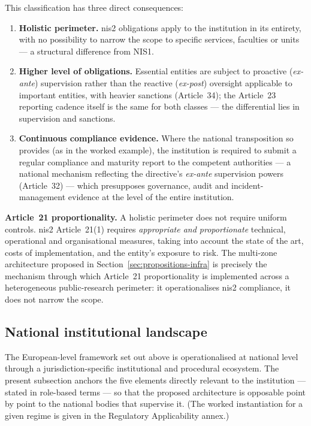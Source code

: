 This classification has three direct consequences:

\begin{enumerate}
    \item \textbf{Holistic perimeter.} \gls{nis2} obligations apply to
    the institution in its entirety, with no possibility to narrow the
    scope to specific services, faculties or units --- a structural
    difference from NIS1.
    \item \textbf{Higher level of obligations.} Essential entities are
    subject to proactive (\emph{ex-ante}) supervision rather than the
    reactive (\emph{ex-post}) oversight applicable to important
    entities, with heavier sanctions (Article~34); the Article~23
    reporting cadence itself is the same for both classes --- the
    differential lies in supervision and sanctions.
    \item \textbf{Continuous compliance evidence.} Where the national
    transposition so provides (as in the worked example), the
    institution is required to submit a regular compliance and
    maturity report to the competent authorities --- a national
    mechanism reflecting the directive's \emph{ex-ante} supervision
    powers (Article~32) --- which presupposes governance, audit and
    incident-management evidence at the level of the entire
    institution.
\end{enumerate}

\textbf{Article~21 proportionality.} A holistic perimeter does not
require uniform controls. \gls{nis2} Article~21(1) requires
\emph{appropriate and proportionate} technical, operational and
organisational measures, taking into account the state of the art,
costs of implementation, and the entity's exposure to risk. The
multi-zone architecture proposed in
Section~\ref{sec:propositions-infra} is precisely the mechanism through
which Article~21 proportionality is implemented across a heterogeneous
public-research perimeter: it operationalises \gls{nis2} compliance, it
does not narrow the scope.

\subsection{National institutional landscape}
\label{sec:lu-landscape}

The European-level framework set out above is operationalised at
national level through a jurisdiction-specific institutional and
procedural ecosystem. The present subsection anchors the five elements
directly relevant to the institution --- stated in role-based terms ---
so that the proposed architecture is opposable point by point to the
national bodies that supervise it. (The worked instantiation for a
given regime is given in the Regulatory Applicability annex.)

